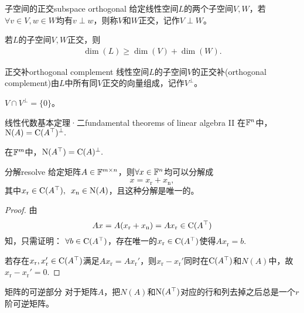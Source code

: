 \begin{definition}{子空间的正交}{subspace orthogonal}
	给定线性空间$L$的两个子空间$V,W$，若$\forall v\in V,w\in W$均有$v\perp w$，则称$V$和$W$正交，记作$V\perp W$。
\end{definition}
\begin{corollary}
	若$L$的子空间$V,W$正交，则
	\begin{align}
		\dim(L)\geqslant\dim(V)+\dim(W).
	\end{align}
\end{corollary}
\begin{definition}{正交补}{orthogonal complement}
	线性空间$L$的子空间$V$的正交补(orthogonal complement)由$L$中所有同$V$正交的向量组成，记作$V^\perp$。
\end{definition}
\begin{corollary}
	$V\cap V^\perp=\{0\}$。
\end{corollary}
\begin{theorem}{线性代数基本定理·二}{fundamental theorems of linear algebra II}
	在$\mathbb F^n$中，$\operatorname{N}(A)=\operatorname{C}(A^\top)^\perp.$

	在$\mathbb F^m$中，$\operatorname{N}(A^\top)=\operatorname{C}(A)^\perp.$
\end{theorem}
\begin{theorem}{分解}{resolve}
给定矩阵$A\in\mathbb F^{m\times n}$，则$\forall x\in\mathbb F^n$均可以分解成
\[
	x=x_\mathrm r+x_\mathrm n,
\]
其中$x_\mathrm r\in\operatorname{C}(A^\top),\enspace x_\mathrm n\in\operatorname{N}(A)$，且这种分解是唯一的。
\end{theorem}
\begin{proof}
	由
	\[
		Ax=A(x_\mathrm r+x_\mathrm n)=Ax_\mathrm r\in\operatorname{C}(A^\top)
	\]
	知，只需证明：
	$\forall b\in\operatorname{C}(A^\top)$，存在唯一的$x_\mathrm r\in\operatorname{C}(A^\top)$使得$Ax_\mathrm r=b.$
	
	若存在$x_\mathrm r,x_\mathrm r'\in\operatorname{C}(A^\top)$满足$Ax_\mathrm r=Ax_\mathrm r'$，则$x_\mathrm r-x_\mathrm r'$同时在$\operatorname{C}(A^\top)$和$N(A)$中，故$x_\mathrm r-x_\mathrm r'=0.$
\end{proof}
\begin{theorem}
	{矩阵的可逆部分}{}
	对于矩阵$A$，把$N(A)$和$\operatorname{N}(A^\top)$对应的行和列去掉之后总是一个$r$阶可逆矩阵。
\end{theorem}
